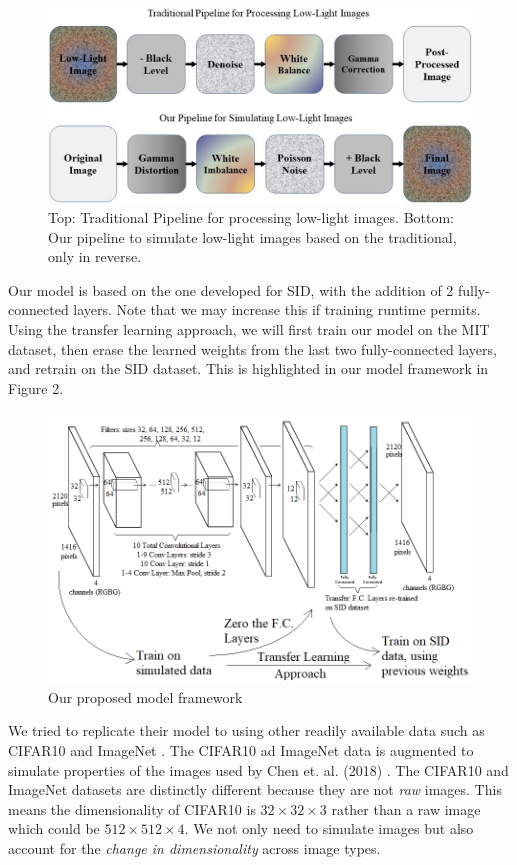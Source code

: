\documentclass{article}
\begin{document}
\begin{figure}[ht]
  \centering
  \includegraphics[scale=0.35]{pipeline.jpg}
  \caption{Top: Traditional Pipeline for processing low-light images. Bottom: Our  pipeline to simulate low-light images based on the traditional, only in reverse.}
\end{figure}

Our model is based on the one developed for SID, with the addition of 2 fully-connected layers. Note that we may increase this if training runtime permits. Using the transfer learning approach, we will first train our model on the MIT dataset, then erase the learned weights from the last two fully-connected layers, and retrain on the SID dataset. This is highlighted in our model framework in Figure 2. 

\begin{figure}[ht]
  \centering
  \includegraphics[scale=0.5]{model.png}
  \caption{Our proposed model framework}
\end{figure}

We tried to replicate their model to using other readily
available data such as CIFAR10 \cite{cifar10} and ImageNet
\cite{imagenet_cvpr09}. The CIFAR10 ad ImageNet data is augmented to
simulate properties of the images used by Chen et. al. (2018)
\cite{chen2018learning}. The CIFAR10 and ImageNet datasets are distinctly
different because they are not \textit{raw} images. This means the
dimensionality of CIFAR10 is $32 \times 32 \times 3$ rather than a raw
image which could be $512 \times 512 \times 4$. We not only need to
simulate images but also account for the \textit{change in dimensionality}
across image types.
\end{document}
